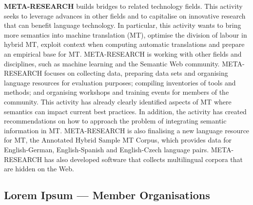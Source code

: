 \documentclass[]{../metanetpaper}
\begin{document}
\begin{Parallel}[c]{80mm}{80mm}
{    \textbf{META-RESEARCH} builds bridges to related technology fields. This activity seeks to leverage advances in other fields and to capitalise on innovative research that can benefit language technology. In particular, this activity wants to bring more semantics into machine translation (MT), optimise the division of labour in hybrid MT, exploit context when computing automatic translations and prepare an empirical base for MT. META-RESEARCH is working with other fields and disciplines, such as machine learning and the Semantic Web community. META-RESEARCH focuses on collecting data, preparing data sets and organising language resources for evaluation purposes; compiling inventories of tools and methods; and organising workshops and training events for members of the community. This activity has already clearly identified aspects of MT where semantics can impact current best practices. In addition, the activity has created recommendations on how to approach the problem of integrating semantic information in MT. META-RESEARCH is also finalising a new language resource for MT, the Annotated Hybrid Sample MT Corpus, which provides data for English-German, English-Spanish and English-Czech language pairs. META-RESEARCH has also developed software that collects multilingual corpora that are hidden on the Web.
  }

  \ParallelPar


  \subsection{Lorem Ipsum --- Member Organisations}

  
  \ParallelPar


\end{Parallel}
\end{document}
